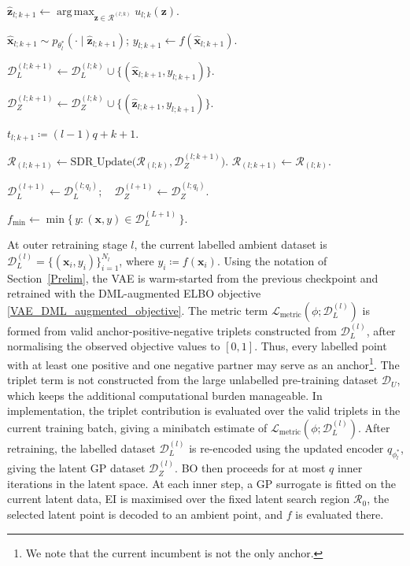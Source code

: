 \documentclass[pdflatex,sn-mathphys-num]{sn-jnl}%
\theoremstyle{thmstyleone}%
\theoremstyle{thmstyletwo}%
\theoremstyle{thmstylethree}%
\begin{document}
\begin{algorithm}[h]
\begin{algorithmic}[1]
    \State
    \(\hat{\mathbf z}_{l;k+1}
    \gets
    \operatorname*{arg\,max}_{\mathbf z\in\mathcal R^{(l;k)}}
    u_{l;k}(\mathbf z)\).

    \State
    \(\hat{\mathbf x}_{l;k+1}
    \sim
    p_{\theta_l^\ast}(\cdot\mid\hat{\mathbf z}_{l;k+1})\);
    \quad
    \(y_{l;k+1}\gets f(\hat{\mathbf x}_{l;k+1})\).

    \State
    \(\mathcal D_L^{(l;k+1)}
    \gets
    \mathcal D_L^{(l;k)}
    \cup
    \{(\hat{\mathbf x}_{l;k+1},y_{l;k+1})\}\).

    \State
    \(\mathcal D_Z^{(l;k+1)}
    \gets
    \mathcal D_Z^{(l;k)}
    \cup
    \{(\hat{\mathbf z}_{l;k+1},y_{l;k+1})\}\).

    \State \(t_{l;k+1}\coloneq (l-1)q+k+1\).

      \State
      \(\mathcal R_{(l;k+1)}
      \gets
      \mathrm{SDR\_Update}
      \bigl(\mathcal R_{(l;k)},\mathcal D_Z^{(l;k+1)}\bigr)\).
    \Else
      \State
      \(\mathcal R_{(l;k+1)}
      \gets
      \mathcal R_{(l;k)}\).
    \EndIf

  \EndFor
  \label{alg:dml-inner-end}

  \State $\mathcal D_L^{(l+1)} \gets \mathcal D_L^{(l;q_l)};\quad \mathcal D_Z^{(l+1)} \gets \mathcal D_Z^{(l;q_l)}$.
\EndFor

\State \Return $f_{\min} \gets \min\{\,y:(\mathbf x,y)\in\mathcal D_L^{(L+1)}\,\}$.

\end{algorithmic}
\end{algorithm}
\normalsize


At outer retraining stage \(l\), the current labelled ambient dataset is $\mathcal D_L^{(l)}=\{(\mathbf x_i,y_i)\}_{i=1}^{N_l}$, where $ y_i \coloneq f(\mathbf x_i)$. Using the notation of Section~\ref{Prelim}, the VAE is warm-started from the previous checkpoint and retrained with the DML-augmented ELBO objective \eqref{VAE_DML_augmented_objective}. The metric term $\mathcal{L}_{\mathrm{metric}}(\phi;\mathcal D_L^{(l)})$ is formed from valid anchor-positive-negative triplets constructed from \(\mathcal D_L^{(l)}\), after normalising the observed objective values to $[0,1]$. Thus, every labelled point with at least one positive and one negative partner may serve as an anchor\footnote{We note that the current incumbent is not the only anchor.}. The triplet term is not constructed from the large unlabelled pre-training dataset \(\mathcal D_U\), which keeps the additional computational burden manageable. In implementation, the triplet contribution is evaluated over the valid triplets in the current training batch, giving a minibatch estimate of \(\mathcal L_{\mathrm{metric}}(\phi;\mathcal D_L^{(l)})\). After retraining, the labelled dataset \(\mathcal D_L^{(l)}\) is re-encoded using the updated encoder \(q_{\phi_l^\ast}\), giving the latent GP dataset \(\mathcal D_Z^{(l)}\). BO then proceeds for at most \(q\) inner iterations in the latent space. At each inner step, a GP surrogate is fitted on the current latent data, EI is maximised over the fixed latent search region \(\mathcal R_0\), the selected latent point is decoded to an ambient point, and \(f\) is evaluated there.
\end{document}
